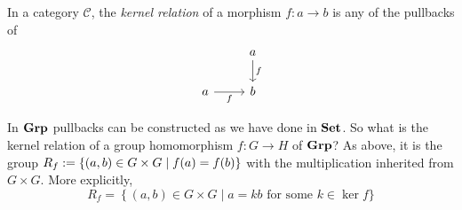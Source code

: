 \begin{definition}
  In a category \(\mathcal{C}\), the {\em kernel relation} of a morphism
  \(f : a \to b\) is any of the pullbacks of
  \[\begin{tikzcd}
      & a \ar["f", d] \\
      a \ar["f", r, swap] & b
    \end{tikzcd}\]
\end{definition}

In \(\mathbf{Grp}\) pullbacks can be constructed as we have done in \(\mathbf{Set}\). So
what is the kernel relation of a group homomorphism \(f : G \to H\) of \(\mathbf{Grp}\)? As above, it
is the group \(R_f := \left\{(a, b) \in G \times G \mid f(a) = f(b)\right\}\) with the
multiplication inherited from \(G \times G\). More explicitly,
\[
  R_f = \left\{ (a, b) \in G \times G \mid a = k b \text{ for some } k \in \ker f
  \right .\}
\]



